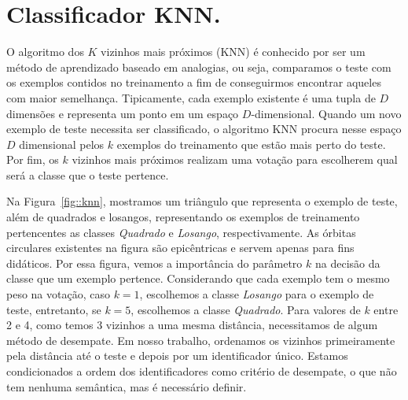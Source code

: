 
\section{Classificador \textsc{KNN}.}
\label{subsec::cred_knn}


O algoritmo dos $K$ vizinhos mais próximos (\textsc{KNN}) é conhecido por ser um método de aprendizado baseado em analogias, ou seja, comparamos o teste com os exemplos contidos no treinamento a fim de conseguirmos encontrar aqueles com maior semelhança.
Tipicamente, cada exemplo existente é uma tupla de $D$ dimensões e representa um ponto em um espaço $D$-dimensional.
Quando um novo exemplo de teste necessita ser classificado, o algoritmo \textsc{KNN} procura nesse espaço $D$ dimensional pelos $k$ exemplos do treinamento que estão mais perto do teste.
Por fim, os $k$ vizinhos mais próximos realizam uma votação para escolherem qual será a classe que o teste pertence.

Na Figura~\ref{fig::knn}, mostramos um triângulo que representa o exemplo de teste, além de quadrados e losangos, representando os exemplos de treinamento pertencentes as classes \textit{Quadrado} e \textit{Losango}, respectivamente. As órbitas circulares existentes na figura são epicêntricas e servem apenas para fins didáticos.
Por essa figura, vemos a importância do parâmetro $k$ na decisão da classe que um exemplo pertence. Considerando que cada exemplo tem o mesmo peso na votação, caso $k=1$, escolhemos a classe \textit{Losango} para o exemplo de teste, entretanto, se $k=5$, escolhemos a classe \textit{Quadrado}. Para valores de $k$ entre 2 e 4, como temos 3 vizinhos a uma mesma distância, necessitamos de algum método de desempate. Em nosso trabalho, ordenamos os vizinhos primeiramente pela distância até o teste e depois por um identificador único. Estamos condicionados a ordem dos identificadores como critério de desempate, o que não tem nenhuma semântica, mas é necessário definir. %

